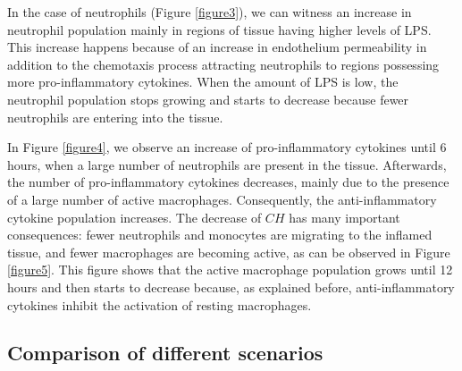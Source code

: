 \documentclass[10pt]{bmc_article}
\newenvironment{bmcformat}{\baselineskip20pt\sloppy\setboolean{publ}{false}}{\baselineskip20pt\sloppy}
\begin{document}
\begin{bmcformat}
In the case of neutrophils (Figure \ref{figure3}), we can witness an increase in neutrophil population mainly in regions of tissue 
having higher levels of LPS. This increase happens because of an increase in endothelium permeability in addition to the chemotaxis 
process attracting neutrophils to regions possessing more pro-inflammatory cytokines. When the amount of LPS is low, the neutrophil 
population stops growing and starts to decrease because fewer neutrophils are entering into the tissue.  


In Figure \ref{figure4}, we observe an increase of pro-inflammatory cytokines until 6 hours, when a large number of neutrophils are 
present in the tissue. Afterwards, the number of pro-inflammatory cytokines decreases, mainly due to the presence of a large number 
of active macrophages. Consequently, the anti-inflammatory cytokine population increases. The decrease of $CH$ has many important 
consequences: fewer neutrophils and monocytes are migrating to the inflamed tissue, and fewer macrophages are becoming active, as 
can be observed in Figure \ref{figure5}. This figure shows that the active macrophage population grows until 12 hours and then starts 
to decrease because, as explained before, anti-inflammatory cytokines inhibit the activation of resting macrophages.




\subsection*{Comparison of different scenarios}


\end{bmcformat}
\end{document}
